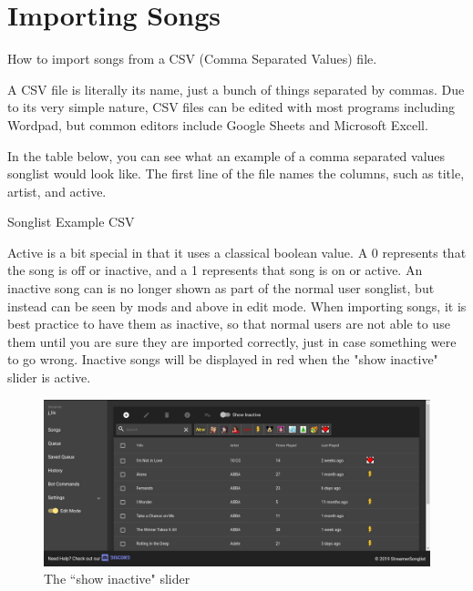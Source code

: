 
\section{Importing Songs}
How to import songs from a CSV (Comma Separated Values) file.

A CSV file is literally its name, just a bunch of things separated by commas. Due to its very simple nature, CSV files can be edited with most programs including Wordpad, but common editors include Google Sheets and Microsoft Excell.

In the table below, you can see what an example of a comma separated values songlist would look like. 
The first line of the file names the columns, such as title, artist, and active. 

\begin{table}[h!]
\caption{Songlist Example CSV}
\label{example.csv}
\end{table}

Active is a bit special in that it uses a classical boolean value. 
A 0 represents that the song is off or inactive, and a 1 represents that song is on or active.
An inactive song can is no longer shown as part of the normal user songlist, but instead can be seen by mods and above in edit mode. 
When importing songs, it is best practice to have them as inactive, so that normal users are not able to use them until you are sure they are imported correctly, just in case something were to go wrong.
Inactive songs will be displayed in red when the "show inactive" slider is active.

\begin{figure}[ht!]
  \includegraphics[width=\linewidth]{src/songlist_import/songlist_main_edit.png}
  \caption{The ``show inactive" slider}
  \label{show inactive}
\end{figure}

